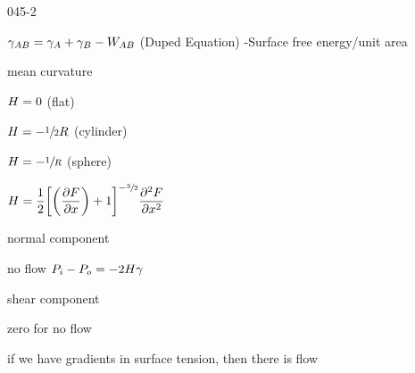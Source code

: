 \begin{mitframe} {045-2}
\begin{listone}
\begin{listtwo}
\begin{listthree}
                        \item $\gamma_{\helmholtz\exergy}=\gamma_{\helmholtz}+\gamma_{\exergy}-\work_{\helmholtz\exergy}$ (Duped Equation) -Surface free energy/unit area
                        \begin{listfour}
                        		\item mean curvature
                                \begin{listfive}
                                	\item $\enthalpy=0$ (flat)
                                    \item $\enthalpy=-\sfrac{1}{2}\gasconst$ (cylinder)
                                    
                                    \item $\enthalpy=-\sfrac{1}{\gasconst}$ (sphere)
                                    \item $\enthalpy=\dfrac{1}{2}\bigg[\bigg(\dfrac{\partial\force}{\partial\disp}\bigg)+1\bigg]^{-\sfrac{3}{2}}\dfrac{\partial^2\force}{\partial\disp^2}$
                                \end{listfive}
                        \end{listfour}
                \end{listthree}
             \item normal component
             		\begin{listthree}
                    		\item no flow $\p_{\state}-\p_{o}=-2\enthalpy\gamma$
                       \end{listthree}
        		\item shear component
                		\begin{listthree}
                        		\item zero for no flow
                                \item if we have gradients in surface tension, then there is flow
                        \end{listthree}
        \end{listtwo}
\end{listone}
\end{mitframe}